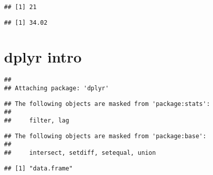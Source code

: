\begin{verbatim}
## [1] 21
\end{verbatim}

\begin{Shaded}
\begin{Highlighting}[]
\OperatorTok{$}\NormalTok{Bodyweight[}\NormalTok{]}
\end{Highlighting}
\end{Shaded}

\begin{verbatim}
## [1] 34.02
\end{verbatim}

\hypertarget{dplyr-intro}{%
\section{dplyr intro}\label{dplyr-intro}}

\begin{Shaded}
\begin{Highlighting}[]
\end{Highlighting}
\end{Shaded}

\begin{verbatim}
## 
## Attaching package: 'dplyr'
\end{verbatim}

\begin{verbatim}
## The following objects are masked from 'package:stats':
## 
##     filter, lag
\end{verbatim}

\begin{verbatim}
## The following objects are masked from 'package:base':
## 
##     intersect, setdiff, setequal, union
\end{verbatim}

\begin{Shaded}
\begin{Highlighting}[]
\StringTok{ }\NormalTok{(}\NormalTok{)}
\end{Highlighting}
\end{Shaded}

\begin{verbatim}
## [1] "data.frame"
\end{verbatim}

\begin{Shaded}
\begin{Highlighting}[]
\end{Highlighting}
\end{Shaded}

